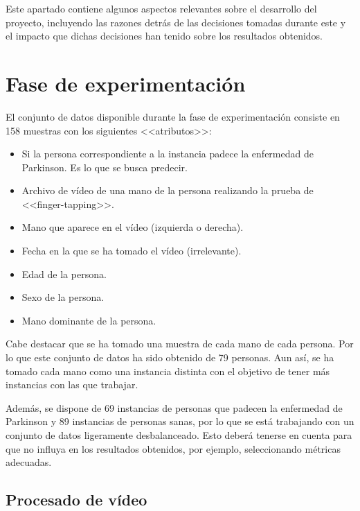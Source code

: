 \label{cha:Aspectos relevantes del desarrollo del proyecto}

Este apartado contiene algunos aspectos relevantes sobre el desarrollo del
proyecto, incluyendo las razones detrás de las decisiones tomadas durante este y
el impacto que dichas decisiones han tenido sobre los resultados obtenidos.

\section{Fase de experimentación}

El conjunto de datos disponible durante la fase de experimentación consiste en
158 muestras con los siguientes <<atributos>>:

\begin{itemize}
    \item Si la persona correspondiente a la instancia padece la enfermedad de
    Parkinson. Es lo que se busca predecir.
    \item Archivo de vídeo de una mano de la persona realizando la prueba de
    <<finger-tapping>>.
    \item Mano que aparece en el vídeo (izquierda o derecha).
    \item Fecha en la que se ha tomado el vídeo (irrelevante).
    \item Edad de la persona.
    \item Sexo de la persona.
    \item Mano dominante de la persona.
\end{itemize}

Cabe destacar que se ha tomado una muestra de cada mano de cada persona. Por lo
que este conjunto de datos ha sido obtenido de 79 personas. Aun así, se ha
tomado cada mano como una instancia distinta con el objetivo de tener más
instancias con las que trabajar.

Además, se dispone de 69 instancias de personas que padecen la enfermedad de
Parkinson y 89 instancias de personas sanas, por lo que se está trabajando con
un conjunto de datos ligeramente desbalanceado. Esto deberá tenerse en cuenta
para que no influya en los resultados obtenidos, por ejemplo, seleccionando
métricas adecuadas.

\subsection{Procesado de vídeo}

